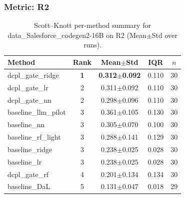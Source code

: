 \subsubsection*{Metric: R2}
\begin{table}[H]
\centering
\scriptsize
\setlength{\tabcolsep}{4pt}
\renewcommand{\arraystretch}{1.1}
\caption{Scott--Knott per-method summary for data\_Salesforce\_codegen2-16B on R2 (Mean$\pm$Std over runs).}
\label{tab:sk_data_Salesforce_codegen2-16B_R2}
\begin{tabular}{l|c|c|c|c}
\hline
\textbf{Method} & \textbf{Rank} & \textbf{Mean$\pm$Std} & \textbf{IQR} & \textbf{$n$} \\
\hline
\rowcolor{red!15} dcpl\_gate\_ridge & \textbf{1} & \textbf{0.312$\pm$0.092} & 0.110 & 30 \\
dcpl\_gate\_lr & 2 & 0.311$\pm$0.092 & 0.110 & 30 \\
dcpl\_gate\_nn & 2 & 0.298$\pm$0.096 & 0.110 & 30 \\
baseline\_llm\_pilot & 3 & 0.361$\pm$0.105 & 0.130 & 30 \\
baseline\_nn & 3 & 0.305$\pm$0.070 & 0.100 & 30 \\
baseline\_rf\_light & 3 & 0.288$\pm$0.141 & 0.129 & 30 \\
baseline\_ridge & 3 & 0.238$\pm$0.025 & 0.028 & 30 \\
baseline\_lr & 3 & 0.238$\pm$0.025 & 0.028 & 30 \\
dcpl\_gate\_rf & 4 & 0.201$\pm$0.134 & 0.134 & 30 \\
baseline\_DaL & 5 & 0.131$\pm$0.047 & 0.018 & 29 \\
\hline
\end{tabular}
\end{table}

